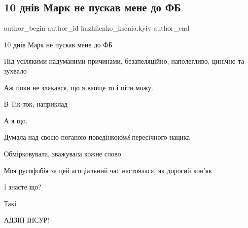  
 
 
 
 

\subsection{10 днів Марк не пускав мене до ФБ}
\label{sec:10_01_2023.fb.hazhilenko_ksenia.kyiv.1.10_dn_v_mark_ne_pusk}

\ifcmt
 author_begin
   author_id hazhilenko_ksenia.kyiv
 author_end
\fi

10 днів Марк не пускав мене до ФБ

Під усілякими надуманими причинами, безапеляційно, наполегливо, цинічно та
зухвало

Аж поки не злякався, що я вапще то і піти можу.

В Тік-ток, наприклад

А я що.

Думала над своєю поганою поведінкою￼ пересічного нацика

Обмірковувала, зважувала кожне слово

Моя русофобія за цей асоціальний час настоялася, як дорогий кон'як

І знаєте що?

Такі

АДЗІП ІНСУР!

